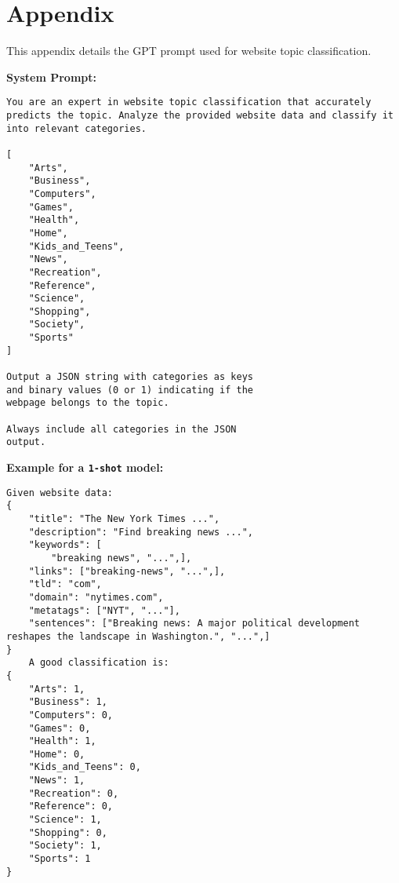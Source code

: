 \section{Appendix}

\label{app:prompt}
This appendix details the GPT prompt used for website topic classification. 

\textbf{System Prompt:} 

\begin{lstlisting}
You are an expert in website topic classification that accurately predicts the topic. Analyze the provided website data and classify it into relevant categories.

[
    "Arts",
    "Business",
    "Computers",
    "Games",
    "Health",
    "Home", 
    "Kids_and_Teens",
    "News",
    "Recreation",
    "Reference",
    "Science", 
    "Shopping",
    "Society",
    "Sports"
]

Output a JSON string with categories as keys
and binary values (0 or 1) indicating if the 
webpage belongs to the topic. 

Always include all categories in the JSON
output.
\end{lstlisting}
\textbf{Example for a \texttt{1-shot} model:}
\begin{lstlisting}
Given website data:
{         
    "title": "The New York Times ...",
    "description": "Find breaking news ...",
    "keywords": [
        "breaking news", "...",],
    "links": ["breaking-news", "...",],
    "tld": "com",
    "domain": "nytimes.com",
    "metatags": ["NYT", "..."],
    "sentences": ["Breaking news: A major political development reshapes the landscape in Washington.", "...",]
}
    A good classification is:
{
    "Arts": 1,
    "Business": 1,
    "Computers": 0,
    "Games": 0,
    "Health": 1,
    "Home": 0,
    "Kids_and_Teens": 0,
    "News": 1,
    "Recreation": 0,
    "Reference": 0,
    "Science": 1,
    "Shopping": 0,
    "Society": 1,
    "Sports": 1
}
\end{lstlisting}


